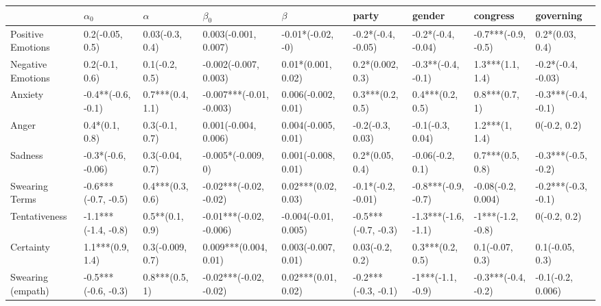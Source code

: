 \begin{tabular}{lllllllll}
\toprule
{} &           $\alpha_0$ &             $\alpha$ &                 $\beta_0$ &                 $\beta$ &                party &               gender &             congress &            governing \\
\midrule
Positive Emotions     &      0.2(-0.05, 0.5) &      0.03(-0.3, 0.4) &      0.003(-0.001, 0.007) &       -0.01*(-0.02, -0) &   -0.2*(-0.4, -0.05) &   -0.2*(-0.4, -0.04) &  -0.7***(-0.9, -0.5) &      0.2*(0.03, 0.4) \\
Negative Emotions     &       0.2(-0.1, 0.6) &       0.1(-0.2, 0.5) &     -0.002(-0.007, 0.003) &      0.01*(0.001, 0.02) &     0.2*(0.002, 0.3) &   -0.3**(-0.4, -0.1) &     1.3***(1.1, 1.4) &   -0.2*(-0.4, -0.03) \\
Anxiety               &   -0.4**(-0.6, -0.1) &     0.7***(0.4, 1.1) &  -0.007***(-0.01, -0.003) &     0.006(-0.002, 0.01) &     0.3***(0.2, 0.5) &     0.4***(0.2, 0.5) &       0.8***(0.7, 1) &  -0.3***(-0.4, -0.1) \\
Anger                 &       0.4*(0.1, 0.8) &       0.3(-0.1, 0.7) &      0.001(-0.004, 0.006) &     0.004(-0.005, 0.01) &     -0.2(-0.3, 0.03) &     -0.1(-0.3, 0.04) &       1.2***(1, 1.4) &         0(-0.2, 0.2) \\
Sadness               &   -0.3*(-0.6, -0.06) &      0.3(-0.04, 0.7) &        -0.005*(-0.009, 0) &     0.001(-0.008, 0.01) &      0.2*(0.05, 0.4) &     -0.06(-0.2, 0.1) &     0.7***(0.5, 0.8) &  -0.3***(-0.5, -0.2) \\
Swearing Terms        &  -0.6***(-0.7, -0.5) &     0.4***(0.3, 0.6) &    -0.02***(-0.02, -0.02) &     0.02***(0.02, 0.03) &   -0.1*(-0.2, -0.01) &  -0.8***(-0.9, -0.7) &   -0.08(-0.2, 0.004) &  -0.2***(-0.3, -0.1) \\
Tentativeness         &  -1.1***(-1.4, -0.8) &      0.5**(0.1, 0.9) &   -0.01***(-0.02, -0.006) &    -0.004(-0.01, 0.005) &  -0.5***(-0.7, -0.3) &  -1.3***(-1.6, -1.1) &    -1***(-1.2, -0.8) &         0(-0.2, 0.2) \\
Certainty             &     1.1***(0.9, 1.4) &     0.3(-0.009, 0.7) &     0.009***(0.004, 0.01) &     0.003(-0.007, 0.01) &      0.03(-0.2, 0.2) &     0.3***(0.2, 0.5) &      0.1(-0.07, 0.3) &      0.1(-0.05, 0.3) \\
Swearing (empath)     &  -0.5***(-0.6, -0.3) &       0.8***(0.5, 1) &    -0.02***(-0.02, -0.02) &     0.02***(0.01, 0.02) &  -0.2***(-0.3, -0.1) &    -1***(-1.1, -0.9) &  -0.3***(-0.4, -0.2) &    -0.1(-0.2, 0.006) \\

\end{tabular}

